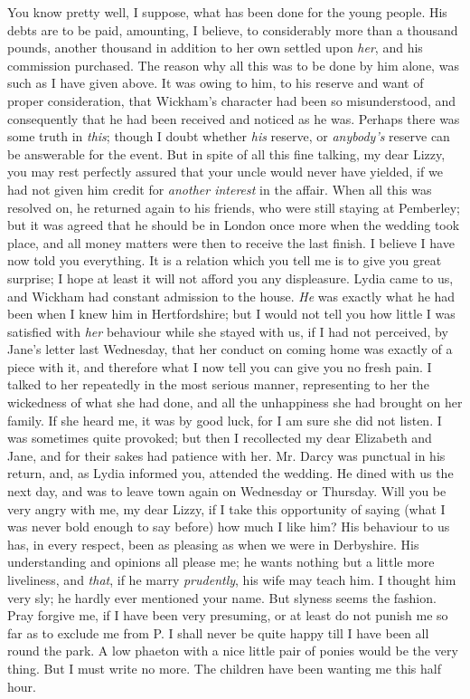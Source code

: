 \documentclass[12pt,openright]{book}
\begin{document}
You know pretty well, I suppose, what has been done for the young people. His debts are to be paid, amounting, I believe, to considerably more than a thousand pounds, another thousand in addition to her own settled upon \textit{her}, and his commission purchased. The reason why all this was to be done by him alone, was such as I have given above. It was owing to him, to his reserve and want of proper consideration, that Wickham’s character had been so misunderstood, and consequently that he had been received and noticed as he was. Perhaps there was some truth in \textit{this}; though I doubt whether \textit{his} reserve, or \textit{anybody’s} reserve can be answerable for the event. But in spite of all this fine talking, my dear Lizzy, you may rest perfectly assured that your uncle would never have yielded, if we had not given him credit for \textit{another interest} in the affair. When all this was resolved on, he returned again to his friends, who were still staying at Pemberley; but it was agreed that he should be in London once more when the wedding took place, and all money matters were then to receive the last finish. I believe I have now told you everything. It is a relation which you tell me is to give you great surprise; I hope at least it will not afford you any displeasure. Lydia came to us, and Wickham had constant admission to the house. \textit{He} was exactly what he had been when I knew him in Hertfordshire; but I would not tell you how little I was satisfied with \textit{her} behaviour while she stayed with us, if I had not perceived, by Jane’s letter last Wednesday, that her conduct on coming home was exactly of a piece with it, and therefore what I now tell you can give you no fresh pain. I talked to her repeatedly in the most serious manner, representing to her the wickedness of what she had done, and all the unhappiness she had brought on her family. If she heard me, it was by good luck, for I am sure she did not listen. I was sometimes quite provoked; but then I recollected my dear Elizabeth and Jane, and for their sakes had patience with her. Mr. Darcy was punctual in his return, and, as Lydia informed you, attended the wedding. He dined with us the next day, and was to leave town again on Wednesday or Thursday. Will you be very angry with me, my dear Lizzy, if I take this opportunity of saying (what I was never bold enough to say before) how much I like him? His behaviour to us has, in every respect, been as pleasing as when we were in Derbyshire. His understanding and opinions all please me; he wants nothing but a little more liveliness, and \textit{that}, if he marry \textit{prudently}, his wife may teach him. I thought him very sly; he hardly ever mentioned your name. But slyness seems the fashion. Pray forgive me, if I have been very presuming, or at least do not punish me so far as to exclude me from P. I shall never be quite happy till I have been all round the park. A low phaeton with a nice little pair of ponies would be the very thing. But I must write no more. The children have been wanting me this half hour.
\end{document}
